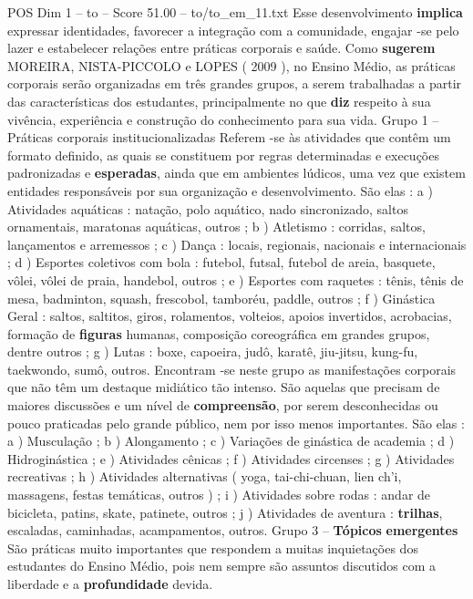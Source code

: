 \begin{textsample}{POS Dim 1 – to – Score 51.00 – to/to\_em\_11.txt}
Esse desenvolvimento \textbf{implica} expressar identidades, favorecer a integração com a comunidade, engajar -se pelo lazer e estabelecer relações entre práticas corporais e saúde.
Como \textbf{sugerem} MOREIRA, NISTA-PICCOLO e LOPES ( 2009 ), no Ensino Médio, as práticas corporais serão organizadas em três grandes grupos, a serem trabalhadas a partir das características dos estudantes, principalmente no que \textbf{diz} respeito à sua vivência, experiência e construção do conhecimento para sua vida.
Grupo 1 – Práticas corporais institucionalizadas Referem -se às atividades que contêm um formato definido, as quais se constituem por regras determinadas e execuções padronizadas e \textbf{esperadas}, ainda que em ambientes lúdicos, uma vez que existem entidades responsáveis por sua organização e desenvolvimento.
São elas : a ) Atividades aquáticas : natação, polo aquático, nado sincronizado, saltos ornamentais, maratonas aquáticas, outros ; b ) Atletismo : corridas, saltos, lançamentos e arremessos ; c ) Dança : locais, regionais, nacionais e internacionais ; d ) Esportes coletivos com bola : futebol, futsal, futebol de areia, basquete, vôlei, vôlei de praia, handebol, outros ; e ) Esportes com raquetes : tênis, tênis de mesa, badminton, squash, frescobol, tamboréu, paddle, outros ; f ) Ginástica Geral : saltos, saltitos, giros, rolamentos, volteios, apoios invertidos, acrobacias, formação de \textbf{figuras} humanas, composição coreográfica em grandes grupos, dentre outros ; g ) Lutas : boxe, capoeira, judô, karatê, jiu-jitsu, kung-fu, taekwondo, sumô, outros.
Encontram -se neste grupo as manifestações corporais que não têm um destaque midiático tão intenso.
São aquelas que precisam de maiores discussões e um nível de \textbf{compreensão}, por serem desconhecidas ou pouco praticadas pelo grande público, nem por isso menos importantes.
São elas : a ) Musculação ; b ) Alongamento ; c ) Variações de ginástica de academia ; d ) Hidroginástica ; e ) Atividades cênicas ; f ) Atividades circenses ; g ) Atividades recreativas ; h ) Atividades alternativas ( yoga, tai-chi-chuan, lien ch’i, massagens, festas temáticas, outros ) ; i ) Atividades sobre rodas : andar de bicicleta, patins, skate, patinete, outros ; j ) Atividades de aventura : \textbf{trilhas}, escaladas, caminhadas, acampamentos, outros.
Grupo 3 – \textbf{Tópicos} \textbf{emergentes} São práticas muito importantes que respondem a muitas inquietações dos estudantes do Ensino Médio, pois nem sempre são assuntos discutidos com a liberdade e a \textbf{profundidade} devida.

\end{textsample}
